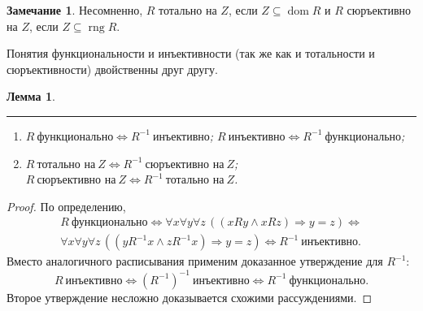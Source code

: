 \documentclass[12pt,notitlepage]{article}
\theoremstyle{plain}
\newtheorem{lemma}[thm]{Лемма}
\theoremstyle{definition}
\newtheorem{rem}[thm]{Замечание}
\theoremstyle{plain}
\newcommand{\sbs}{\subseteq}
\newcommand{\dom}{\mathop{\mathrm{dom}}}
\newcommand{\rng}{\mathop{\mathrm{rng}}}
\newcommand{\1}{\mathbf{1}}
\newcommand{\0}{\mathbf{0}}
\newcommand{\ply}{\Longrightarrow}
\begin{document}
\begin{rem}
	Несомненно, $R$ тотально на $Z$, если $Z \sbs \dom R$ и $R$ сюръективно на $Z$, если $Z \sbs \rng R$.
\end{rem}


Понятия функциональности и инъективности (так же как и тотальности и сюръективности) двойственны друг другу.
\begin{lemma}\label{ch0:fnc_inv}\rule{1pt}{0pt}
	\begin{enumerate}
		\item $R\ \mbox{функционально} \iff R^{-1}\ \mbox{инъективно}$; $R\ \mbox{инъективно} \iff R^{-1}\ \mbox{функционально}$;
		\item $R\ \mbox{тотально на}\ Z \iff R^{-1}\ \mbox{сюръективно на}\ Z$; $R\ \mbox{сюръективно на}\ Z \iff R^{-1}\ \mbox{тотально на}\ Z$.
	\end{enumerate}
\end{lemma}
\begin{proof}
	По определению,
	\begin{multline*}
		R\ \mbox{функционально} \iff \forall x \forall y \forall z\, ( (x R y \wedge x R z) \ply y = z ) \iff\\
		\forall x \forall y \forall z\, ( (y R^{-1} x \wedge z R^{-1} x) \ply y = z )  \iff R^{-1}\ \mbox{инъективно}.
	\end{multline*}
	Вместо аналогичного расписывания применим доказанное утверждение для $R^{-1}$:
	$$
	R\ \mbox{инъективно} \iff (R^{-1})^{-1}\ \mbox{инъективно} \iff R^{-1}\ \mbox{функционально}.
	$$
	Второе утверждение несложно доказывается схожими рассуждениями.
\end{proof}
\end{document}
